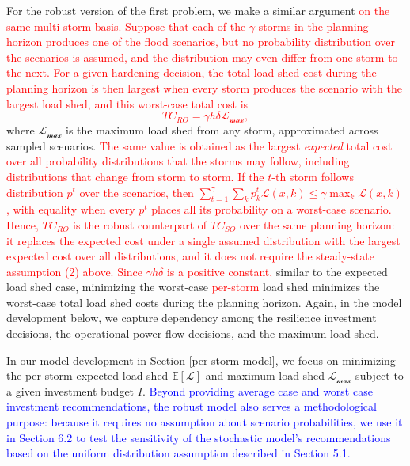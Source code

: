 \documentclass[authoryear,preprint,review,12pt]{elsarticle}\usepackage{amssymb}
\begin{document}
For the robust version of the first problem, we make a similar argument \textcolor{red}{on the same multi-storm basis. Suppose that each of the $\gamma$ storms in the planning horizon produces one of the flood scenarios, but no probability distribution over the scenarios is assumed, and the distribution may even differ from one storm to the next. For a given hardening decision, the total load shed cost during the planning horizon is then largest when every storm produces the scenario with the largest load shed, and this worst-case total cost is}
\textcolor{red}{
\begin{equation}
    TC_{RO} = \gamma h \delta \mathcal{L_{\max}}, \label{tc_ro}
\end{equation}
}
\noindent where $\mathcal{L_{\max}}$ is the maximum load shed from any storm, approximated across sampled scenarios. \textcolor{red}{The same value is obtained as the largest \emph{expected} total cost over all probability distributions that the storms may follow, including distributions that change from storm to storm. If the $t$-th storm follows distribution $p^t$ over the scenarios, then $\sum_{t=1}^{\gamma} \sum_{k} p_k^t \mathcal{L}(x,k) \leq \gamma \max_{k} \mathcal{L}(x,k)$, with equality when every $p^t$ places all its probability on a worst-case scenario. Hence, $TC_{RO}$ is the robust counterpart of $TC_{SO}$ over the same planning horizon: it replaces the expected cost under a single assumed distribution with the largest expected cost over all distributions, and it does not require the steady-state assumption (2) above. Since $\gamma h \delta$ is a positive constant,} similar to the expected load shed case, minimizing the worst-case \textcolor{red}{per-storm} load shed minimizes the worst-case total load shed costs during the planning horizon. Again, in the model development below, we capture dependency among the resilience investment decisions, the operational power flow decisions, and the maximum load shed. 

In our model development in Section \ref{per-storm-model}, we focus on minimizing the per-storm expected load shed $\mathbb{E}[\mathcal{L}]$ and maximum load shed $\mathcal{L_{\max}}$ subject to a given investment budget $I$. \textcolor{blue}{Beyond providing average case and worst case investment recommendations, the robust model also serves a methodological purpose: because it requires no assumption about scenario probabilities, we use it in Section 6.2 to test the sensitivity of the stochastic model's recommendations based on the uniform distribution assumption described in Section 5.1.}
\end{document}
